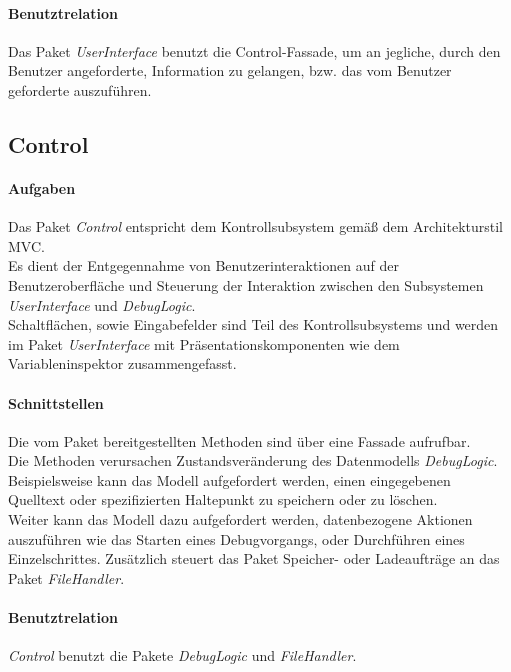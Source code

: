 \documentclass[parskip=full]{scrartcl}
\begin{document}
\paragraph{Benutztrelation} Das Paket \textit{UserInterface} benutzt die Control-Fassade, um an jegliche, durch den Benutzer angeforderte, Information zu gelangen, bzw. das vom Benutzer geforderte auszuführen. %


\subsection{Control}
\paragraph{Aufgaben}
    Das Paket \textit{Control} entspricht dem Kontrollsubsystem gemäß dem Architekturstil MVC.\\
    Es dient der Entgegennahme von Benutzerinteraktionen auf der Benutzeroberfläche und Steuerung der Interaktion zwischen den
    Subsystemen \textit{UserInterface} und \textit{DebugLogic}.\\
    Schaltflächen, sowie Eingabefelder sind Teil des Kontrollsubsystems und werden im Paket 
    \textit{UserInterface} mit Präsentationskomponenten wie dem Variableninspektor zusammengefasst.\\
\paragraph{Schnittstellen}
    Die vom Paket bereitgestellten Methoden sind über eine Fassade aufrufbar.\\
    Die Methoden verursachen Zustandsveränderung des Datenmodells \textit{DebugLogic}.\\
    Beispielsweise kann das Modell aufgefordert werden, einen eingegebenen Quelltext oder spezifizierten Haltepunkt
    zu speichern oder zu löschen.\\
    Weiter kann das Modell dazu aufgefordert werden, datenbezogene Aktionen auszuführen wie
    das Starten eines Debugvorgangs, oder Durchführen eines Einzelschrittes. Zusätzlich steuert das Paket Speicher- oder Ladeaufträge an das Paket \textit{FileHandler}. 

\paragraph{Benutztrelation}
    \textit{Control} benutzt die Pakete \textit{DebugLogic} und \textit{FileHandler}.%
\end{document}

